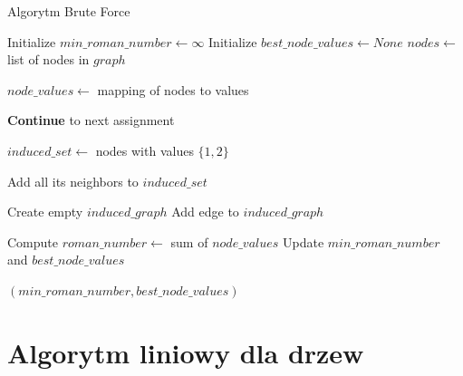 \begin{algorithm}
    \caption*{Algorytm Brute Force}
    \begin{algorithmic}[1]
            \State Initialize $min\_roman\_number \gets \infty$
            \State Initialize $best\_node\_values \gets None$
            \State $nodes \gets$ list of nodes in $graph$
    
                \State $node\_values \gets$ mapping of nodes to values
                
                 
                            \State \textbf{Continue} to next assignment
                        \EndIf
                    \EndIf
                \EndFor
                
                \State $induced\_set \gets$ nodes with values $\{1,2\}$
    
                    \State Add all its neighbors to $induced\_set$
                \EndFor
    
                \State Create empty $induced\_graph$
                                \State Add edge to $induced\_graph$
                            \EndIf
                        \EndFor
                    \EndIf
                \EndFor
    
                    \State Compute $roman\_number \gets$ sum of $node\_values$
                        \State Update $min\_roman\_number$ and $best\_node\_values$
                    \EndIf
                \EndIf
            \EndFor
    
            \State \Return $(min\_roman\_number, best\_node\_values)$
        \EndFunction
    \end{algorithmic}
\end{algorithm}

\section{Algorytm liniowy dla drzew}

